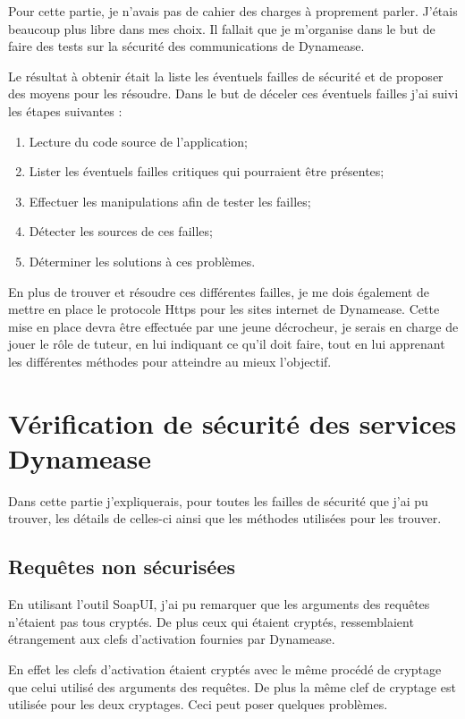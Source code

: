 Pour cette partie, je n'avais pas de cahier des charges à proprement parler. J'étais beaucoup plus libre dans mes choix. Il fallait que je m'organise dans le but de faire des tests sur la sécurité des communications de Dynamease. 

Le résultat à obtenir était la liste les éventuels failles de sécurité et de proposer des moyens pour les résoudre. Dans le but de déceler ces éventuels failles j'ai suivi les étapes suivantes :

\begin{enumerate}
	\item Lecture du code source de l'application;
	\item Lister les éventuels failles critiques qui pourraient être présentes;
	\item Effectuer les manipulations afin de tester les failles;
	\item Détecter les sources de ces failles;
	\item Déterminer les solutions à ces problèmes.
\end{enumerate} 

En plus de trouver et résoudre ces différentes failles, je me dois également de mettre en place le protocole Https pour les sites internet de Dynamease. Cette mise en place devra être effectuée par une jeune décrocheur, je serais en charge de jouer le rôle de tuteur, en lui indiquant ce qu'il doit faire, tout en lui apprenant les différentes méthodes pour atteindre au mieux l'objectif. 

\section{Vérification de sécurité des services Dynamease}

Dans cette partie j'expliquerais, pour toutes les failles de sécurité que j'ai pu trouver, les détails de celles-ci ainsi que les méthodes utilisées pour les trouver.

\subsection{Requêtes non sécurisées}

En utilisant l'outil SoapUI, j'ai pu remarquer que les arguments des requêtes n'étaient pas tous cryptés. De plus ceux qui étaient cryptés, ressemblaient étrangement aux clefs d'activation fournies par Dynamease.

En effet les clefs d'activation étaient cryptés avec le même procédé de cryptage que celui utilisé des arguments des requêtes. De plus la même clef de cryptage est utilisée pour les deux cryptages. Ceci peut poser quelques problèmes.

